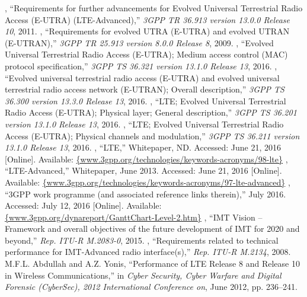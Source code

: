 %

\begin{thebibliography}{99.}%
	, ``{Requirements for further advancements for Evolved Universal Terrestrial Radio Access (E-UTRA) (LTE-Advanced)},'' \emph{{3GPP TR 36.913 version 13.0.0 Release 10}}, 2011.
	, ``{Requirements for evolved UTRA (E-UTRA) and evolved UTRAN (E-UTRAN)},'' \emph{{3GPP TR 25.913 version 8.0.0 Release 8}}, 2009.
	, ``{Evolved Universal Terrestrial Radio Access (E-UTRA); Medium access control (MAC) protocol specification},'' \emph{{3GPP TS 36.321 version 13.1.0 Release 13}}, 2016.
	, ``{Evolved universal terrestrial radio access (E-UTRA) and evolved universal terrestrial radio access network (E-UTRAN); Overall description},'' \emph{{3GPP TS 36.300 version 13.3.0 Release 13}}, 2016.
	, ``LTE; Evolved Universal Terrestrial Radio Access (E-UTRA); Physical layer; General description,'' \emph{{3GPP TS 36.201 version 13.1.0 Release 13}}, 2016.
	, ``LTE; Evolved Universal Terrestrial Radio Access (E-UTRA); Physical channels and modulation,'' \emph{{3GPP TS 36.211 version 13.1.0 Release 13}}, 2016.
	, ``{LTE},'' Whitepaper, ND. Accessed: June 21, 2016 [Online]. Available: \url{{www.3gpp.org/technologies/keywords-acronyms/98-lte}}
	, ``{LTE-Advanced},'' Whitepaper, June 2013. Accessed: June 21, 2016 [Online]. Available: \url{{www.3gpp.org/technologies/keywords-acronyms/97-lte-advanced}}
	, ``{3GPP work programme (and associated reference links therein)},'' July 2016. Accessed: July 12, 2016 [Online]. Available: \url{{www.3gpp.org/dynareport/GanttChart-Level-2.htm}}		
	, ``IMT Vision –	Framework and overall objectives of the future development of IMT for 2020 and beyond,'' \emph{Rep. ITU-R M.2083-0}, 2015. 
	, ``Requirements related to technical performance for IMT-Advanced radio interface(s),'' \emph{Rep. ITU-R M.2134}, 2008. 
	 {M.F.L. Abdullah and A.Z. Yonis}, ``{Performance of LTE Release 8 and Release 10 in Wireless Communications},'' in \emph{{Cyber Security, Cyber Warfare and Digital Forensic (CyberSec), 2012 International Conference on}}, June 2012, pp. 236--241.
		
\end{thebibliography}
